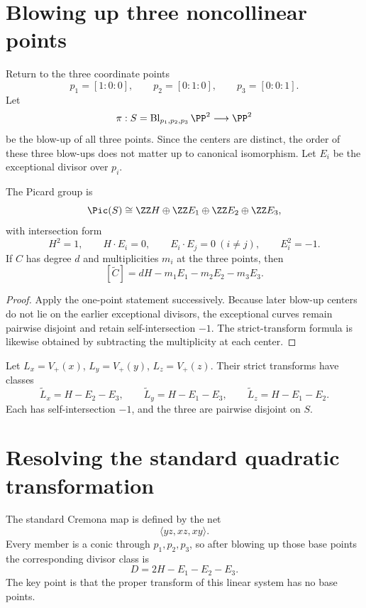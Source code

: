 \section{Blowing up three noncollinear points}

Return to the three coordinate points
\[
  p_1=[1:0:0],\qquad p_2=[0:1:0],\qquad p_3=[0:0:1].
\]
Let
\[
  \pi:S=\Bl_{p_1,p_2,p_3}\PP^2\longrightarrow\PP^2
\]
be the blow-up of all three points.  Since the centers are distinct, the order of these three blow-ups does not matter up to canonical isomorphism.  Let \(E_i\) be the exceptional divisor over \(p_i\).

\begin{theorem}\label{thm:vi45-three-point-lattice}
The Picard group is
\[
  \Pic(S)\cong\ZZ H\oplus\ZZ E_1\oplus\ZZ E_2\oplus\ZZ E_3,
\]
with intersection form
\[
  H^2=1,\qquad H\cdot E_i=0,\qquad E_i\cdot E_j=0\ (i\neq j),
  \qquad E_i^2=-1.
\]
If \(C\) has degree \(d\) and multiplicities \(m_i\) at the three points, then
\[
  [\widetilde C]=dH-m_1E_1-m_2E_2-m_3E_3.
\]
\end{theorem}

\begin{proof}
Apply the one-point statement successively.  Because later blow-up centers do not lie on the earlier exceptional divisors, the exceptional curves remain pairwise disjoint and retain self-intersection \(-1\).  The strict-transform formula is likewise obtained by subtracting the multiplicity at each center.
\end{proof}

Let \(L_x=V_+(x)\), \(L_y=V_+(y)\), \(L_z=V_+(z)\).  Their strict transforms have classes
\[
  \widetilde L_x=H-E_2-E_3,
  \qquad
  \widetilde L_y=H-E_1-E_3,
  \qquad
  \widetilde L_z=H-E_1-E_2.
\]
Each has self-intersection \(-1\), and the three are pairwise disjoint on \(S\).



\section{Resolving the standard quadratic transformation}

The standard Cremona map is defined by the net
\[
  \langle yz,xz,xy\rangle.
\]
Every member is a conic through \(p_1,p_2,p_3\), so after blowing up those base points the corresponding divisor class is
\[
  D=2H-E_1-E_2-E_3.
\]
The key point is that the proper transform of this linear system has no base points.

